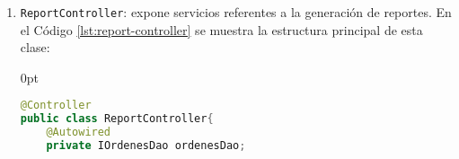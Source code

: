 \begin{enumerate}
\begin{enumerate}
	\end{enumerate}
\pagebreak
\begin{adjustwidth}{\listingfixwidth}{0pt}
\begin{lstlisting}[language=Java, caption={Servicio web para obtener una orden de reposición.}, captionpos=b, label={lst:get-orden-data-controller}]
@RequestMapping(value = "/_data_/orden/{id}",
				method = RequestMethod.GET)
public Orden getOrden(@PathVariable("id") Long id) throws SQLException{
	return ordenesDao.getOrdenById(id);
}
\end{lstlisting}
\end{adjustwidth}
	\item \texttt{ReportController}: expone servicios referentes a la generación de reportes. En el Código \ref{lst:report-controller} se muestra la estructura principal de esta clase:
\begin{adjustwidth}{\listingfixwidth}{0pt}
\begin{lstlisting}[language=Java, caption={Controlador para exponer servicios web de generación de reportes.}, captionpos=b, label={lst:report-controller}]
@Controller
public class ReportController{
	@Autowired
	private IOrdenesDao ordenesDao;
	

\end{lstlisting}
\end{adjustwidth}
\end{enumerate}
